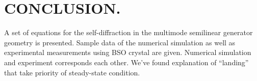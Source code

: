 \section{CONCLUSION.}

\noindent A set of equations for the self-diffraction in the multimode 
semilinear generator geometry is presented.  Sample data of the
numerical simulation as well as experimental measurements using
BSO crystal are given. Numerical simulation and experiment corresponds
each other. We've found explanation of ``landing''  that take priority
of steady-state condition.  
